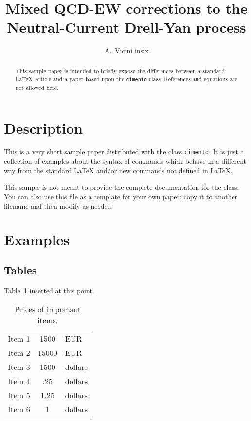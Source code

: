 \documentclass{cimento}
\title{Mixed QCD-EW corrections to the Neutral-Current Drell-Yan process}
\author{A.~Vicini {ins:x}}
\begin{document}
\maketitle

\begin{abstract}
This sample paper is intended to briefly expose the differences
between a standard \LaTeX\ article and a paper based upon the
\texttt{cimento} class. References and equations are not allowed here. 
\end{abstract}

\section{Description}
This is a very short sample paper distributed with the class
\texttt{cimento}.
It is just a collection of examples about the syntax of commands
which behave in a different way from the standard \LaTeX
and/or new commands not defined in \LaTeX.




This sample is not meant to provide the complete documentation for the class.
You can also use this file as a template for your own paper:
copy it to another filename and then modify as needed.

\section{Examples}

\subsection{Tables}
Table~\ref{tab:pricesI}
inserted at this point.

\begin{table}
  \caption{Prices of important items.}
  \label{tab:pricesI}
  \begin{tabular}{rcl}
    \hline
      Item 1      & 1500  & EUR    \\
      Item 2 & 15000 & EUR    \\
      Item 3      & 1500  & dollars \\
    \hline
      Item 4     & .25   & dollars \\
      Item 5         & 1.25  & dollars \\
      Item 6         & 1     & dollars \\
    \hline
  \end{tabular}
\end{table}
\end{document}
